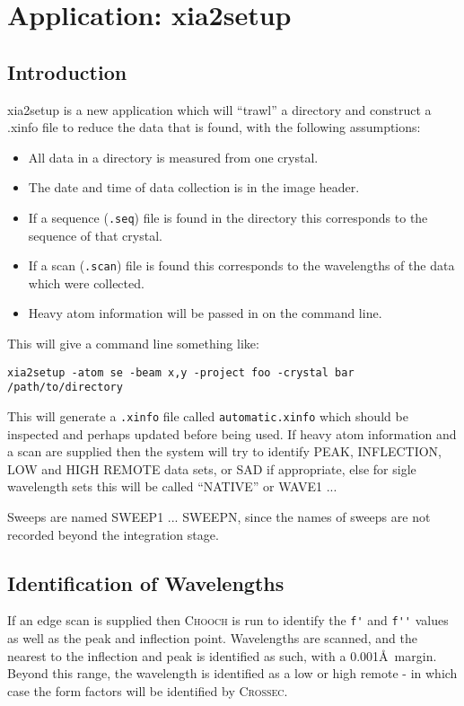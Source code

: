 \documentclass[a4paper, 11pt]{article}
\begin{document}
\section{Application: xia2setup}
\subsection{Introduction}

xia2setup is a new application which will ``trawl'' a directory and construct
a .xinfo file to reduce the data that is found, with the following assumptions:

\begin{itemize}
\item{All data in a directory is measured from one crystal.}
\item{The date and time of data collection is in the image header.}
\item{If a sequence (\verb|.seq|) file is found in the directory this
corresponds to the sequence of that crystal.}
\item{If a scan (\verb|.scan|) file is found this corresponds to the
wavelengths of the data which were collected.}
\item{Heavy atom information will be passed in on the command line.}
\end{itemize}

This will give a command line something like:

\begin{verbatim}
xia2setup -atom se -beam x,y -project foo -crystal bar /path/to/directory
\end{verbatim}

This will generate a \verb|.xinfo| file called \verb|automatic.xinfo|
which should be inspected and perhaps updated before being used. If heavy
atom information and a scan are supplied then the system will try to identify 
PEAK, INFLECTION, LOW and HIGH REMOTE data sets, or SAD if appropriate, else 
for sigle wavelength sets this will be called ``NATIVE'' or WAVE1 ...

Sweeps are named SWEEP1 ... SWEEPN, since the names of sweeps are not recorded
beyond the integration stage.

\subsection{Identification of Wavelengths}

If an edge scan is supplied then \textsc{Chooch} is run to identify the 
\verb|f'| and \verb|f''| values as well as the peak and inflection point.
Wavelengths are scanned, and the nearest to the inflection and peak is 
identified as such, with a 0.001\AA\ margin. Beyond this range, the wavelength
is identified as a low or high remote - in which case the form factors will
be identified by \textsc{Crossec}.
\end{document}
